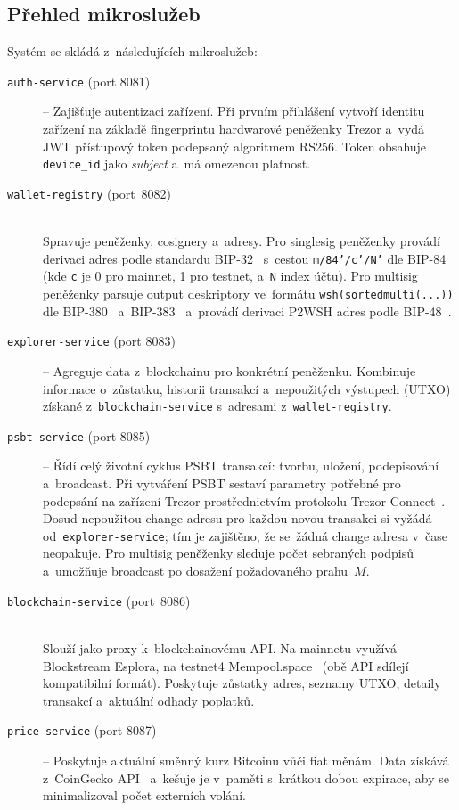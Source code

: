 \subsection{Přehled mikroslužeb}

Systém se skládá z~následujících mikroslužeb:

\begin{description}
\item[\texttt{auth-service} (port 8081)] -- Zajišťuje autentizaci zařízení.
  Při prvním přihlášení vytvoří identitu zařízení na základě fingerprintu
  hardwarové peněženky Trezor a~vydá JWT přístupový token podepsaný algoritmem
  RS256. Token obsahuje \texttt{device\_id} jako \emph{subject} a~má omezenou
  platnost.

\item[\texttt{wallet-registry} (port~8082)] \hfill \\
  Spravuje peněženky, cosignery a~adresy. Pro singlesig peněženky provádí
  derivaci adres podle standardu BIP-32~\cite{BIP32} s~cestou
  \texttt{m/84'/\allowbreak c'/\allowbreak N'} dle BIP-84~\cite{BIP84}
  (kde \texttt{c} je 0 pro mainnet, 1 pro testnet, a~\texttt{N} index účtu).
  Pro multisig peněženky parsuje output deskriptory ve~formátu
  \texttt{wsh(\allowbreak sorted\-multi(...))} dle BIP-380~\cite{BIP380}
  a~BIP-383~\cite{BIP383} a~provádí derivaci P2WSH adres podle
  BIP-48~\cite{BIP48}.

\item[\texttt{explorer-service} (port 8083)] -- Agreguje data z~blockchainu
  pro konkrétní peněženku. Kombinuje informace o~zůstatku, historii transakcí
  a~nepoužitých výstupech (UTXO) získané z~\texttt{blockchain-service}
  s~adresami z~\texttt{wallet-registry}.

\item[\texttt{psbt-service} (port 8085)] -- Řídí celý životní cyklus PSBT
  transakcí: tvorbu, uložení, podepisování a~broadcast. Při vytváření PSBT
  sestaví parametry potřebné pro podepsání na zařízení Trezor
  prostřednictvím protokolu Trezor Connect~\cite{TrezorConnect}. Dosud
  nepoužitou change adresu pro každou novou transakci si vyžádá
  od~\texttt{explorer-service}; tím je zajištěno, že se~žádná change
  adresa v~čase neopakuje. Pro multisig peněženky sleduje počet
  sebraných podpisů a~umožňuje broadcast po dosažení požadovaného
  prahu~$M$.

\item[\texttt{blockchain-service} (port~8086)] \hfill \\
  Slouží jako proxy k~blockchainovému API. Na mainnetu využívá
  Blockstream Esplora, na testnet4 Mempool.space~\cite{MempoolAPI}
  (obě API sdílejí kompatibilní formát). Poskytuje zůstatky adres,
  seznamy UTXO, detaily transakcí a~aktuální odhady poplatků.

\item[\texttt{price-service} (port 8087)] -- Poskytuje aktuální směnný
  kurz Bitcoinu vůči fiat měnám. Data získává z~CoinGecko
  API~\cite{CoinGeckoAPI} a~kešuje je v~paměti s~krátkou dobou expirace,
  aby se minimalizoval počet externích volání.
\end{description}

